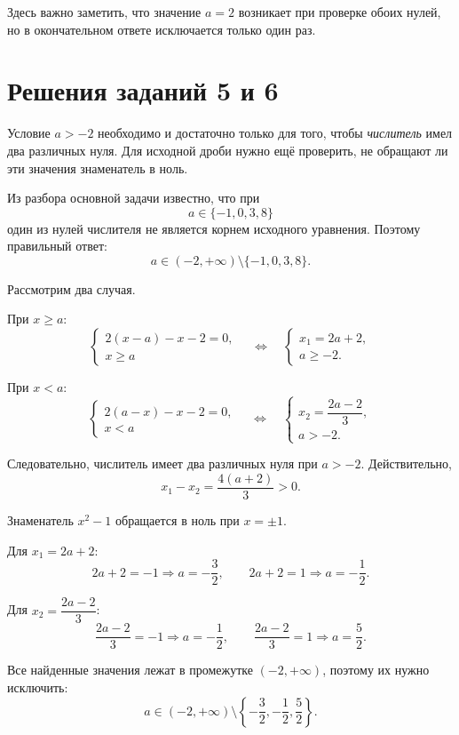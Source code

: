 \begin{criterionbox}
  Здесь важно заметить, что значение \(a=2\) возникает при проверке обоих
  нулей, но в окончательном ответе исключается только один раз.
\end{criterionbox}

\clearpage
\section*{Решения заданий 5 и 6}

\begin{teacheranswer}
  Условие \(a>-2\) необходимо и достаточно только для того, чтобы
  \emph{числитель} имел два различных нуля. Для исходной дроби нужно ещё
  проверить, не обращают ли эти значения знаменатель в ноль.

  Из разбора основной задачи известно, что при
  \[
    a\in\{-1,0,3,8\}
  \]
  один из нулей числителя не является корнем исходного уравнения. Поэтому
  правильный ответ:
  \[
    \boxed{a\in(-2,+\infty)\setminus\{-1,0,3,8\}}.
  \]
\end{teacheranswer}

\begin{teacheranswer}
  Рассмотрим два случая.

  При \(x\ge a\):
  \[
    \begin{cases}
      2(x-a)-x-2=0,\\
      x\ge a
    \end{cases}
    \quad\Longleftrightarrow\quad
    \begin{cases}
      x_1=2a+2,\\
      a\ge-2.
    \end{cases}
  \]

  При \(x<a\):
  \[
    \begin{cases}
      2(a-x)-x-2=0,\\
      x<a
    \end{cases}
    \quad\Longleftrightarrow\quad
    \begin{cases}
      x_2=\dfrac{2a-2}{3},\\
      a>-2.
    \end{cases}
  \]

  Следовательно, числитель имеет два различных нуля при \(a>-2\).
  Действительно,
  \[
    x_1-x_2=\frac{4(a+2)}3>0.
  \]
\end{teacheranswer}

\begin{teacheranswer}
  Знаменатель \(x^2-1\) обращается в ноль при \(x=\pm1\).

  Для \(x_1=2a+2\):
  \[
    2a+2=-1\Rightarrow a=-\frac32,
    \qquad
    2a+2=1\Rightarrow a=-\frac12.
  \]

  Для \(x_2=\dfrac{2a-2}{3}\):
  \[
    \frac{2a-2}{3}=-1\Rightarrow a=-\frac12,
    \qquad
    \frac{2a-2}{3}=1\Rightarrow a=\frac52.
  \]

  Все найденные значения лежат в промежутке \((-2,+\infty)\), поэтому их
  нужно исключить:
  \[
    \boxed{
      a\in(-2,+\infty)\setminus
      \left\{-\frac32,-\frac12,\frac52\right\}
    }.
  \]
\end{teacheranswer}

